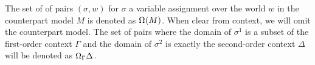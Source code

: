 The set of of pairs $(\sigma, w)$ for $\sigma$ a variable assignment over the world $w$ in the counterpart model $M$ is
denoted as $\Omega_{}{}(M)$. When clear from context, we will omit the counterpart model. The set of pairs where the
domain of $\sigma^1$ is a subset of the first-order context $\Gamma$ and the domain of $\sigma^2$ is exactly the
second-order context $\Delta$ will be denoted as $\Omega_{\Gamma}{\Delta}$.
